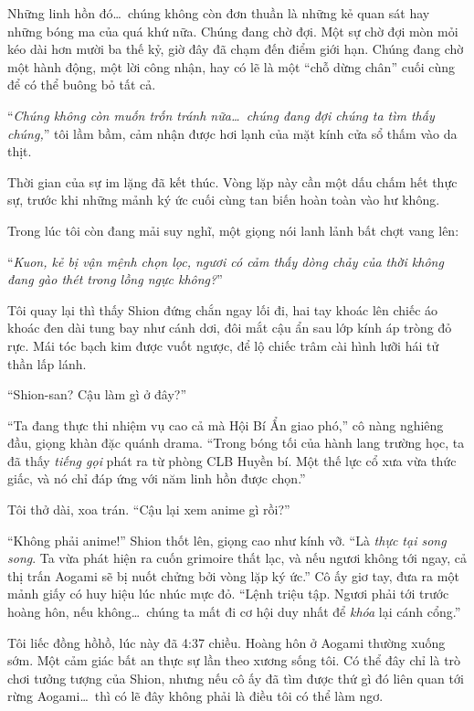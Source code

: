 \documentclass[../main.tex]{subfiles}
\begin{document}
Những linh hồn đó\dots\ chúng không còn đơn thuần là những kẻ quan sát hay những bóng ma của quá khứ nữa. Chúng đang chờ đợi. Một sự chờ đợi mòn mỏi kéo dài hơn mười ba thế kỷ, giờ đây đã chạm đến điểm giới hạn. Chúng đang chờ một hành động, một lời công nhận, hay có lẽ là một ``chỗ dừng chân'' cuối cùng để có thể buông bỏ tất cả.

``\textit{Chúng không còn muốn trốn tránh nữa\dots\ chúng đang đợi chúng ta tìm thấy chúng,}'' tôi lầm bầm, cảm nhận được hơi lạnh của mặt kính cửa sổ thấm vào da thịt.

Thời gian của sự im lặng đã kết thúc. Vòng lặp này cần một dấu chấm hết thực sự, trước khi những mảnh ký ức cuối cùng tan biến hoàn toàn vào hư không.

Trong lúc tôi còn đang mải suy nghĩ, một giọng nói lanh lảnh bất chợt vang lên:

``\textit{Kuon, kẻ bị vận mệnh chọn lọc, ngươi có cảm thấy dòng chảy của thời không đang gào thét trong lồng ngực không?}''

Tôi quay lại thì thấy Shion đứng chắn ngay lối đi, hai tay khoác lên chiếc áo khoác đen dài tung bay như cánh dơi, đôi mắt cậu ẩn sau lớp kính áp tròng đỏ rực. Mái tóc bạch kim được vuốt ngược, để lộ chiếc trâm cài hình lưỡi hái tử thần lấp lánh.

``Shion-san? Cậu làm gì ở đây?''

``Ta đang thực thi nhiệm vụ cao cả mà Hội Bí Ẩn giao phó,'' cô nàng nghiêng đầu, giọng khàn đặc quánh drama. ``Trong bóng tối của hành lang trường học, ta đã thấy \textit{tiếng gọi} phát ra từ phòng CLB Huyền bí. Một thế lực cổ xưa vừa thức giấc, và nó chỉ đáp ứng với năm linh hồn được chọn.''

Tôi thở dài, xoa trán. ``Cậu lại xem anime gì rồi?''

``Không phải anime!'' Shion thốt lên, giọng cao như kính vỡ. ``Là \textit{thực tại song song}. Ta vừa phát hiện ra cuốn grimoire thất lạc, và nếu ngươi không tới ngay, cả thị trấn Aogami sẽ bị nuốt chửng bởi vòng lặp ký ức.'' Cô ấy giơ tay, đưa ra một mảnh giấy có huy hiệu lúc nhúc mực đỏ. ``Lệnh triệu tập. Ngươi phải tới trước hoàng hôn, nếu không\dots\ chúng ta mất đi cơ hội duy nhất để \textit{khóa} lại cánh cổng.''

Tôi liếc đồng hồhồ, lúc này đã 4:37 chiều. Hoàng hôn ở Aogami thường xuống sớm. Một cảm giác bất an thực sự lần theo xương sống tôi. Có thể đây chỉ là trò chơi tưởng tượng của Shion, nhưng nếu cô ấy đã tìm được thứ gì đó liên quan tới rừng Aogami\dots\ thì có lẽ đây không phải là điều tôi có thể làm ngơ.
\end{document}
